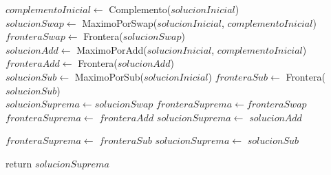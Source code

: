 \begin{algorithm}[H]
\begin{algorithmic}
    \State $complementoInicial \gets$ Complemento($solucionInicial$) \\

    \State $solucionSwap \gets$ MaximoPorSwap($solucionInicial$, $complementoInicial$)
    \State $fronteraSwap \gets$ Frontera($solucionSwap$) \\

    \State $solucionAdd \gets$ MaximoPorAdd($solucionInicial$, $complementoInicial$)
    \State $fronteraAdd \gets$ Frontera($solucionAdd$) \\

    \State $solucionSub \gets$ MaximoPorSub($solucionInicial$)
    \State $fronteraSub \gets$ Frontera($solucionSub$) \\

    \State $solucionSuprema \gets solucionSwap$
    \State $fronteraSuprema \gets fronteraSwap$ \\

        \State $fronteraSuprema \gets$ $fronteraAdd$
        \State $solucionSuprema \gets$ $solucionAdd$  \\
    \EndIf

        \State $fronteraSuprema \gets$ $fronteraSub$
        \State $solucionSuprema \gets$ $solucionSub$ \\
    \EndIf

    \State return $solucionSuprema$
\EndFunction

\end{algorithmic}
\end{algorithm}


